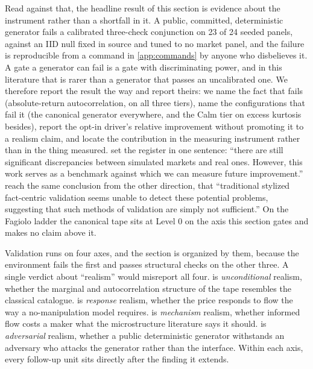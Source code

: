 Read against that, the headline result of this section is evidence about the instrument rather than a shortfall in it. A public, committed, deterministic generator fails a calibrated three-check conjunction on 23 of 24 seeded panels, against an IID null fixed in source and tuned to no market panel, and the failure is reproducible from a command in \cref{app:commands} by anyone who disbelieves it. A gate a generator can fail is a gate with discriminating power, and in this literature that is rarer than a generator that passes an uncalibrated one. We therefore report the result the way \citet{vyetrenko2020getreal} and \citet{nagy2025lobbench} report theirs: we name the fact that fails (absolute-return autocorrelation, on all three tiers), name the configurations that fail it (the canonical generator everywhere, and the Calm tier on excess kurtosis besides), report the opt-in driver's relative improvement without promoting it to a realism claim, and locate the contribution in the measuring instrument rather than in the thing measured.  set the register in one sentence: ``there are still significant discrepancies between simulated markets and real ones. However, this work serves as a benchmark against which we can measure future improvement.''  reach the same conclusion from the other direction, that ``traditional stylized fact-centric validation seems unable to detect these potential problems, suggesting that such methods of validation are simply not sufficient.'' On the Fagiolo ladder the canonical tape sits at Level 0 on the axis this section gates and makes no claim above it.

Validation runs on four axes, and the section is organized by them, because the environment fails the first and passes structural checks on the other three. A single verdict about ``realism'' would misreport all four.  is \emph{unconditional} realism, whether the marginal and autocorrelation structure of the tape resembles the classical catalogue.  is \emph{response} realism, whether the price responds to flow the way a no-manipulation model requires.  is \emph{mechanism} realism, whether informed flow costs a maker what the microstructure literature says it should.  is \emph{adversarial} realism, whether a public deterministic generator withstands an adversary who attacks the generator rather than the interface. Within each axis, every follow-up unit sits directly after the finding it extends.

